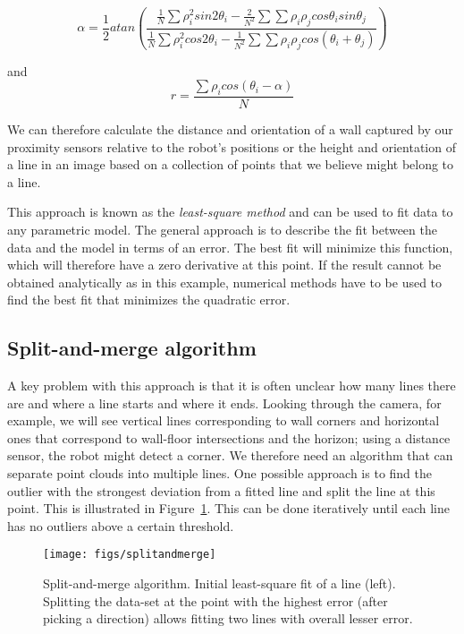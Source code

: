 \begin{equation}\label{eq:linealpha}
\alpha=\frac{1}{2}atan\left(\frac{\frac{1}{N}\sum{\rho_i^2 sin 2\theta_i}-\frac{2}{N^2}\sum{\sum{\rho_i\rho_j cos \theta_i sin \theta_j}}}{\frac{1}{N}\sum{\rho_i^2 cos 2 \theta_i - \frac{1}{N^2}\sum{\sum{\rho_i \rho_j cos(\theta_i+\theta_j)}}}}\right)
\end{equation}

and
\begin{equation}\label{eq:liner}
r=\frac{{\sum \rho_i cos (\theta_i-\alpha)}}{N}
\end{equation}

We can therefore calculate the distance and orientation of a wall captured by our proximity sensors relative to the robot's positions or the height and orientation of a line in an image based on a collection of points that we believe might belong to a line.

This approach is known as the \emph{least-square method} and can be used to fit data to any parametric model. The general approach is to describe the fit between the data and the model in terms of an error. The best fit will minimize this function, which will therefore have a zero derivative at this point. If the result cannot be obtained analytically as in this example, numerical methods have to be used to find the best fit that minimizes the quadratic error.

\subsection{Split-and-merge algorithm}
A key problem with this approach is that it is often unclear how many lines there are and where a line starts and where it ends. Looking through the camera, for example, we will see vertical lines corresponding to wall corners and horizontal ones that correspond to wall-floor intersections and the horizon; using a distance sensor, the robot might detect a corner. We therefore need an algorithm that can separate point clouds into multiple lines. One possible approach is to find the outlier with the strongest deviation from a fitted line and split the line at this point. This is illustrated in Figure~\ref{fig:splitandmerge}. This can be done iteratively until each line has no outliers above a certain threshold.

\begin{figure}
\texttt{[image: figs/splitandmerge]}
\caption{Split-and-merge algorithm. Initial least-square fit of a line (left). Splitting the data-set at the point with the highest error (after picking a direction) allows fitting two lines with overall lesser error.\label{fig:splitandmerge}}
\end{figure}

